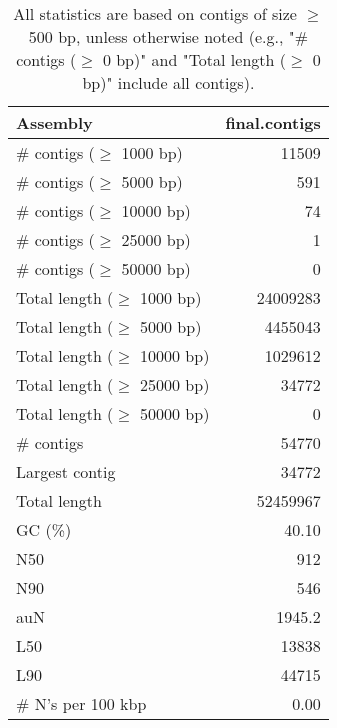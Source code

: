 \documentclass[12pt,a4paper]{article}
\begin{document}
\begin{table}[ht]
\begin{center}
\caption{All statistics are based on contigs of size $\geq$ 500 bp, unless otherwise noted (e.g., "\# contigs ($\geq$ 0 bp)" and "Total length ($\geq$ 0 bp)" include all contigs).}
\begin{tabular}{|l*{1}{|r}|}
\hline
Assembly & final.contigs \\ \hline
\# contigs ($\geq$ 1000 bp) & 11509 \\ \hline
\# contigs ($\geq$ 5000 bp) & 591 \\ \hline
\# contigs ($\geq$ 10000 bp) & 74 \\ \hline
\# contigs ($\geq$ 25000 bp) & 1 \\ \hline
\# contigs ($\geq$ 50000 bp) & 0 \\ \hline
Total length ($\geq$ 1000 bp) & 24009283 \\ \hline
Total length ($\geq$ 5000 bp) & 4455043 \\ \hline
Total length ($\geq$ 10000 bp) & 1029612 \\ \hline
Total length ($\geq$ 25000 bp) & 34772 \\ \hline
Total length ($\geq$ 50000 bp) & 0 \\ \hline
\# contigs & 54770 \\ \hline
Largest contig & 34772 \\ \hline
Total length & 52459967 \\ \hline
GC (\%) & 40.10 \\ \hline
N50 & 912 \\ \hline
N90 & 546 \\ \hline
auN & 1945.2 \\ \hline
L50 & 13838 \\ \hline
L90 & 44715 \\ \hline
\# N's per 100 kbp & 0.00 \\ \hline
\end{tabular}
\end{center}
\end{table}
\end{document}
